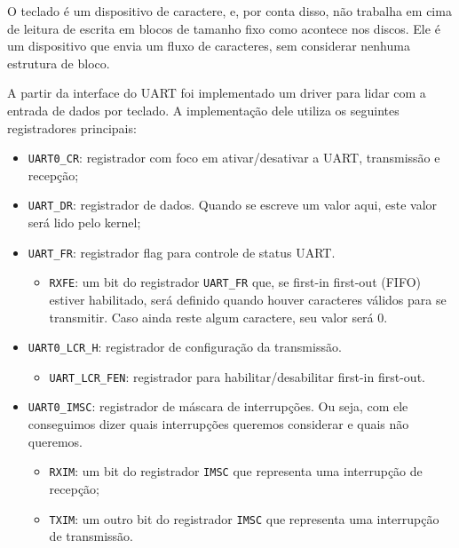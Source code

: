 O teclado é um dispositivo de caractere, e, por conta disso, não trabalha em cima de leitura de escrita em blocos de tamanho fixo como acontece nos discos. Ele é um dispositivo que envia um fluxo de caracteres, sem considerar nenhuma estrutura de bloco.

A partir da interface do UART \cite{jankovic:qemu-uart-interface} foi implementado um driver para lidar com a entrada de dados por teclado. A implementação dele utiliza os seguintes registradores \cite{arm:summary-registers} principais:

\begin{itemize}
    \item \texttt{UART0\_CR}: registrador com foco em ativar/desativar a UART, transmissão e recepção;
    
    \item \texttt{UART\_DR}: registrador de dados. Quando se escreve um valor aqui, este valor será lido pelo kernel;
    
    \item \texttt{UART\_FR}: registrador flag para controle de status UART.
    \begin{itemize}
        \item \texttt{RXFE}: um bit do registrador \texttt{UART\_FR} que, se first-in first-out (FIFO) estiver habilitado, será definido quando houver caracteres válidos para se transmitir. Caso ainda reste algum caractere, seu valor será 0.
    \end{itemize}
    
    \item \texttt{UART0\_LCR\_H}: registrador de configuração da transmissão.
    \begin{itemize}
        \item \texttt{UART\_LCR\_FEN}: registrador para habilitar/desabilitar first-in first-out.
    \end{itemize}
    
    \item \texttt{UART0\_IMSC}: registrador de máscara de interrupções. Ou seja, com ele conseguimos dizer quais interrupções queremos considerar e quais não queremos.
    \begin{itemize}
        \item \texttt{RXIM}: um bit do registrador \texttt{IMSC} que representa uma interrupção de recepção;
        
        \item \texttt{TXIM}: um outro bit do registrador \texttt{IMSC} que representa uma interrupção de transmissão.
    \end{itemize}
    

\end{itemize}
